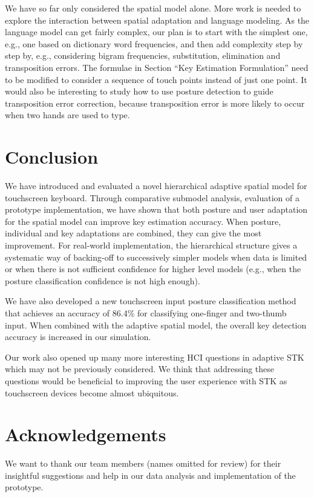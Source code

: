 \documentclass{sigchi}
\begin{document}
We have so far only considered the spatial model alone. More work is needed
to explore the interaction between spatial adaptation and language modeling.
As the language model can get fairly complex, our plan is to start with the
simplest one, e.g., one based on dictionary word frequencies, and then add
complexity step by step by, e.g., considering bigram frequencies, substitution,
elimination and transposition errors.
The formulae in Section ``Key Estimation Formulation'' need to be modified to consider a
sequence of touch points \cite{Goodman:2002, Gunawardana:2010} instead of just one point.
It would also be interesting to study how to use posture detection to guide 
transposition error correction, because transposition error is more likely to 
occur when two hands are used to type.

\section{Conclusion}
We have introduced and evaluated a novel hierarchical adaptive spatial model for
touchscreen keyboard. Through comparative submodel analysis, evaluation of a prototype implementation, we have shown that both posture and user adaptation for the spatial model can improve key estimation accuracy. When posture, individual and key adaptations are combined, they can
give the most improvement. For real-world
implementation, the
hierarchical structure gives a systematic way of backing-off to successively simpler models  when data is limited
or when there is not sufficient confidence for higher level models (e.g., when the posture classification confidence is not 
high enough).

We have also developed a new touchscreen input posture classification method
that achieves an accuracy of 86.4\% for classifying one-finger and two-thumb input. When
combined with the adaptive spatial model, the overall key detection accuracy is increased
in our simulation.

Our work also opened up many more interesting HCI questions in adaptive STK
which may not be previously considered. We think that addressing these questions
would be beneficial to improving the user experience with STK as touchscreen
devices become almost ubiquitous.

\section{Acknowledgements}
We want to thank our team members (names omitted for review) for their insightful
suggestions and help in  our data analysis and implementation of the prototype.
\balance
\small


\end{document}
